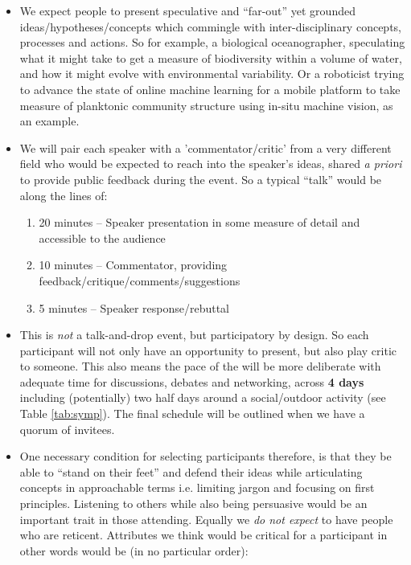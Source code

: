 \begin{itemize}

\item We expect people to present speculative and ``far-out'' yet
  grounded ideas/hypotheses/concepts which commingle with
  inter-disciplinary concepts, processes and actions. So for example,
  a biological oceanographer, speculating what it might take to get a
  measure of biodiversity within a volume of water, and how it might
  evolve with environmental variability. Or a roboticist trying to
  advance the state of online machine learning for a mobile platform
  to take measure of planktonic community structure using in-situ
  machine vision, as an example. 

\item We will pair each speaker with a 'commentator/critic' from a
  very different field who would be expected to reach into the
  speaker's ideas, shared \emph{a priori} to provide public feedback
  during the event. So a typical ``talk'' would be along the lines of:

  \begin{enumerate}

    \item 20 minutes -- Speaker presentation in some measure of
      detail and accessible to the audience
    \item 10 minutes -- Commentator, providing
      feedback/critique/comments/suggestions
    \item 5 minutes -- Speaker response/rebuttal

  \end{enumerate}

\item This is \emph{not} a talk-and-drop event, but participatory by
  design. So each participant will not only have an opportunity to
  present, but also play critic to someone. This also means the pace
  of the \symp will be more deliberate with adequate time for
  discussions, debates and networking, across \textbf{4 days}
  including (potentially) two half days around a social/outdoor
  activity (see Table \ref{tab:symp}). The final schedule will be
  outlined when we have a quorum of invitees.

\item One necessary condition for selecting participants therefore, is
  that they be able to ``stand on their feet'' and defend their ideas
  while articulating concepts in approachable terms i.e. limiting
  jargon and focusing on first principles. Listening to others while
  also being persuasive would be an important trait in those
  attending. Equally we \emph{do not expect} to have people who are
  reticent. Attributes we think would be critical for a participant in
  other words would be (in no particular order):


\end{itemize}
